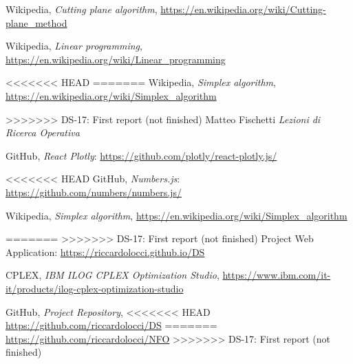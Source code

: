 \documentclass[9pt]{extarticle}
\begin{document}
    \begin{thebibliography}{7}

        Wikipedia,
        \textit{Cutting plane algorithm},
        \url{https://en.wikipedia.org/wiki/Cutting-plane_method}

        Wikipedia,
        \textit{Linear programming},
        \url{https://en.wikipedia.org/wiki/Linear_programming}

<<<<<<< HEAD
=======
        Wikipedia,
        \textit{Simplex algorithm},
        \url{https://en.wikipedia.org/wiki/Simplex_algorithm}
        
>>>>>>> DS-17: First report (not finished)
        Matteo Fischetti
        \textit{ Lezioni di Ricerca Operativa }

        GitHub,
        \textit{React Plotly}:
        \url{https://github.com/plotly/react-plotly.js/}

<<<<<<< HEAD
        GitHub,
        \textit{Numbers.js}:
        \url{https://github.com/numbers/numbers.js/}

        Wikipedia,
        \textit{Simplex algorithm},
        \url{https://en.wikipedia.org/wiki/Simplex_algorithm}

=======
>>>>>>> DS-17: First report (not finished)
        Project Web Application: \url{https://riccardolocci.github.io/DS}
        
        CPLEX,
        \textit{IBM ILOG CPLEX Optimization Studio},
        \url{https://www.ibm.com/it-it/products/ilog-cplex-optimization-studio}

        GitHub,
        \textit{Project Repository},
<<<<<<< HEAD
        \url{https://github.com/riccardolocci/DS}
=======
        \url{https://github.com/riccardolocci/NFO}
>>>>>>> DS-17: First report (not finished)

    \end{thebibliography}
\end{document}
